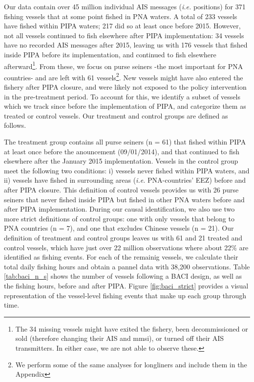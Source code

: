 \documentclass[11pt,]{article}
\let\rmarkdownfootnote\footnote%
\def\footnote{\protect\rmarkdownfootnote}
\begin{document}
Our data contain over 45 million individual AIS messages (\emph{i.e.}
positions) for 371 fishing vessels that at some point fished in PNA
waters. A total of 233 vessels have fished within PIPA waters; 217 did
so at least once before 2015. However, not all vessels continued to fish
elsewhere after PIPA implementation: 34 vessels have no recorded AIS
messages after 2015, leaving us with 176 vessels that fished inside PIPA
before its implementation, and continued to fish elsewhere
afterward\footnote{The 34 missing vessels might have exited the fishery, been decommissioned or sold (therefore changing their AIS and mmsi), or turned off their AIS transmitters. In either case, we are not able to observe these.}.
From these, we focus on purse seiners -the most important for PNA
countries- and are left with 61
vessels\footnote{We perform some of the same analyses for longliners and include them in the Appendix}.
New vessels might have also entered the fishery after PIPA closure, and
were likely not exposed to the policy intervention in the pre-treatment
period. To account for this, we identify a subset of vessels which we
track since before the implementation of PIPA, and categorize them as
treated or control vessels. Our treatment and control groups are defined
as follows.

The treatment group contains all purse seiners (n = 61) that fished
within PIPA at least once before the anouncement (09/01/2014), and that
continued to fish elsewhere after the January 2015 implementation.
Vessels in the control group meet the following two conditions: i)
vessels never fished within PIPA waters, and ii) vessels have fished in
surrounding areas (\emph{i.e.} PNA-countries' EEZ) before and after PIPA
closure. This definition of control vessels provides us with 26 purse
seiners that never fished inside PIPA but fished in other PNA waters
before and after PIPA implementation. During our causal identification,
we also use two more strict definitions of control groups: one with only
vessels that belong to PNA countries (n = 7), and one that excludes
Chinese vessels (n = 21). Our definition of treatment and control groups
leaves us with 61 and 21 treated and control vessels, which have just
over 22 million observations where about 22\% are identified as fishing
events. For each of the remainig vessels, we calculate their total daily
fishing hours and obtain a pannel data with 38,200 observations. Table
\ref{tab:baci_n_s} shows the number of vessels following a BACI design,
as well as the fishing hours, before and after PIPA. Figure
\ref{fig:baci_strict} provides a visual representation of the
vessel-level fishing events that make up each group through time.
\end{document}
